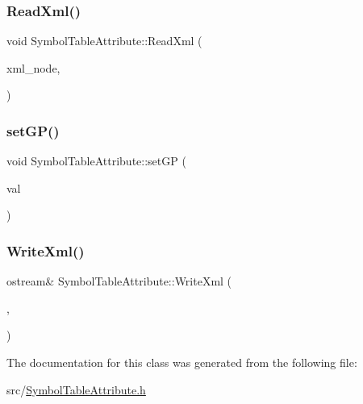 \subsubsection{\texorpdfstring{Read\+Xml()}{ReadXml()}}
{\footnotesize\ttfamily void Symbol\+Table\+Attribute\+::\+Read\+Xml (\begin{DoxyParamCaption}\item[{Xml\+Tag const $\ast$}]{xml\+\_\+node,  }\item[{cfglib\+::\+Handle \&}]{ }\end{DoxyParamCaption})}

\mbox{\label{classSymbolTableAttribute_a5cebeb90706d6570a12d4abd22ae0173}} 
\subsubsection{\texorpdfstring{set\+G\+P()}{setGP()}}
{\footnotesize\ttfamily void Symbol\+Table\+Attribute\+::set\+GP (\begin{DoxyParamCaption}\item[{unsigned long}]{val }\end{DoxyParamCaption})}

\mbox{\label{classSymbolTableAttribute_a8caf49a2a632b014a597acee79d3b4ce}} 
\subsubsection{\texorpdfstring{Write\+Xml()}{WriteXml()}}
{\footnotesize\ttfamily ostream\& Symbol\+Table\+Attribute\+::\+Write\+Xml (\begin{DoxyParamCaption}\item[{std\+::ostream \&}]{,  }\item[{cfglib\+::\+Handle \&}]{ }\end{DoxyParamCaption})}



The documentation for this class was generated from the following file\+:\begin{DoxyCompactItemize}
\item 
src/\hyperlink{SymbolTableAttribute_8h}{Symbol\+Table\+Attribute.\+h}\end{DoxyCompactItemize}
